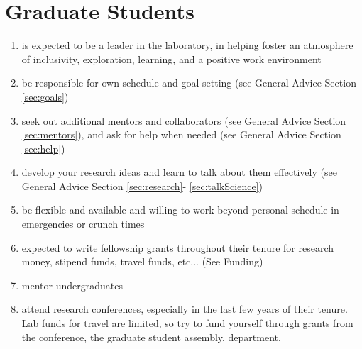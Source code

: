 \documentclass[12pt]{article}
\begin{document}
\section{Graduate Students}
\begin{enumerate}
\item is expected to be a leader in the laboratory, in helping foster
  an atmosphere of inclusivity, exploration, learning, and a positive
  work environment
\item be responsible for own schedule and goal setting (see General Advice
  Section \ref{sec:goals})
\item seek out additional mentors and collaborators (see General
  Advice Section \ref{sec:mentors}), and ask for help when needed (see
  General Advice Section \ref{sec:help})
\item develop your research ideas and learn to talk about them
  effectively (see General Advice Section \ref{sec:research}-
  \ref{sec:talkScience})
\item be flexible and available and willing to work beyond personal
  schedule in emergencies or crunch times
\item expected to write fellowship grants throughout their tenure for
  research money, stipend funds, travel funds, etc... (See Funding)
\item mentor undergraduates
\item attend research conferences, especially in the last few years of
  their tenure. Lab funds for travel are limited, so try to fund
  yourself through grants from the conference, the graduate student
  assembly, department.
\end{enumerate}
\end{document}
